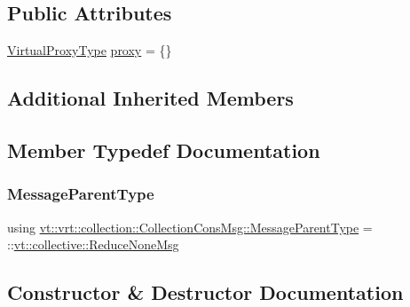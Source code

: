 \subsection*{Public Attributes}
\begin{DoxyCompactItemize}
\item 
\hyperlink{namespacevt_a1b417dd5d684f045bb58a0ede70045ac}{Virtual\+Proxy\+Type} \hyperlink{structvt_1_1vrt_1_1collection_1_1_collection_cons_msg_aa059f3f1cab01c7858b13752eae287d5}{proxy} = \{\}
\end{DoxyCompactItemize}
\subsection*{Additional Inherited Members}


\subsection{Member Typedef Documentation}
\mbox{\label{structvt_1_1vrt_1_1collection_1_1_collection_cons_msg_a59f6b635772168f6a9770648f67c3c10}} 
\subsubsection{\texorpdfstring{Message\+Parent\+Type}{MessageParentType}}
{\footnotesize\ttfamily using \hyperlink{structvt_1_1vrt_1_1collection_1_1_collection_cons_msg_a59f6b635772168f6a9770648f67c3c10}{vt\+::vrt\+::collection\+::\+Collection\+Cons\+Msg\+::\+Message\+Parent\+Type} =  \+::\hyperlink{namespacevt_1_1collective_aa439a90f05078f2bcf918641c951946f}{vt\+::collective\+::\+Reduce\+None\+Msg}}



\subsection{Constructor \& Destructor Documentation}
\mbox{\label{structvt_1_1vrt_1_1collection_1_1_collection_cons_msg_af0c627a9c74cb19c0aa142fa650ed4eb}} 
